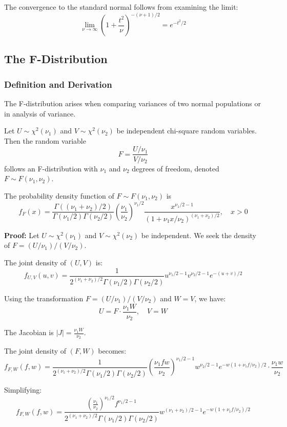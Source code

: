 \documentclass[twoside]{book}
\begin{document}
The convergence to the standard normal follows from examining the limit:
$$\lim_{\nu \to \infty} \left(1 + \frac{t^2}{\nu}\right)^{-(\nu+1)/2} = e^{-t^2/2}$$


\subsection{The F-Distribution}

\subsubsection{Definition and Derivation}

The F-distribution arises when comparing variances of two normal populations or in analysis of variance.

\begin{textbox}
Let $U \sim \chi^2(\nu_1)$ and $V \sim \chi^2(\nu_2)$ be independent chi-square random variables. Then the random variable
$$F = \frac{U/\nu_1}{V/\nu_2}$$
follows an F-distribution with $\nu_1$ and $\nu_2$ degrees of freedom, denoted $F \sim F(\nu_1, \nu_2)$.
\end{textbox}

\begin{textbox}
The probability density function of $F \sim F(\nu_1, \nu_2)$ is
$$f_F(x) = \frac{\Gamma((\nu_1+\nu_2)/2)}{\Gamma(\nu_1/2)\Gamma(\nu_2/2)} \left(\frac{\nu_1}{\nu_2}\right)^{\nu_1/2} \frac{x^{\nu_1/2-1}}{(1+\nu_1 x/\nu_2)^{(\nu_1+\nu_2)/2}}, \quad x > 0$$
\end{textbox}

\textbf{Proof:} Let $U \sim \chi^2(\nu_1)$ and $V \sim \chi^2(\nu_2)$ be independent. We seek the density of $F = (U/\nu_1)/(V/\nu_2)$.

The joint density of $(U,V)$ is:
$$f_{U,V}(u,v) = \frac{1}{2^{(\nu_1+\nu_2)/2}\Gamma(\nu_1/2)\Gamma(\nu_2/2)} u^{\nu_1/2-1} v^{\nu_2/2-1} e^{-(u+v)/2}$$

Using the transformation $F = (U/\nu_1)/(V/\nu_2)$ and $W = V$, we have:
$$U = F \cdot \frac{\nu_1 W}{\nu_2}, \quad V = W$$

The Jacobian is $|J| = \frac{\nu_1 W}{\nu_2}$.

The joint density of $(F,W)$ becomes:
$$f_{F,W}(f,w) = \frac{1}{2^{(\nu_1+\nu_2)/2}\Gamma(\nu_1/2)\Gamma(\nu_2/2)} \left(\frac{\nu_1 f w}{\nu_2}\right)^{\nu_1/2-1} w^{\nu_2/2-1} e^{-w(1+\nu_1 f/\nu_2)/2} \cdot \frac{\nu_1 w}{\nu_2}$$

Simplifying:
$$f_{F,W}(f,w) = \frac{\left(\frac{\nu_1}{\nu_2}\right)^{\nu_1/2} f^{\nu_1/2-1}}{2^{(\nu_1+\nu_2)/2}\Gamma(\nu_1/2)\Gamma(\nu_2/2)} w^{(\nu_1+\nu_2)/2-1} e^{-w(1+\nu_1 f/\nu_2)/2}$$
\end{document}
